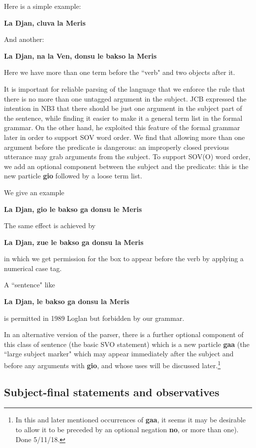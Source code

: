 \documentclass[12pt]{book}
\begin{document}
{Here is a simple example:

{\bf La Djan, cluva la Meris}

And another:

{\bf La Djan, na la Ven, donsu le bakso la Meris}

Here we have more than one term before the ``verb" and two objects after it.

It is important for reliable parsing of the language that we enforce the rule that there is no more than one untagged argument in the subject.  JCB
expressed the intention in NB3 that there should be just one argument in the subject part of the sentence, while finding it easier to make it a general term list in the formal  grammar.  On the other hand, he exploited this feature of the formal grammar  later in order to support SOV word order.  We find that allowing more than one argument
before the predicate is dangerous:  an improperly closed previous utterance may grab arguments from the subject.  To support SOV(O) word order,
we add an optional component between the subject and the predicate:  this is the new particle {\bf gio} followed by a loose term list.

We give an example

{\bf La Djan, gio le bakso ga donsu le Meris}

The same effect is achieved by

{\bf La Djan, zue le bakso ga donsu la Meris}

in which we get permission for the box to appear before the verb by applying a numerical case tag.

A ``sentence" like

{\bf*La Djan, le bakso ga donsu la Meris}

is permitted in 1989 Loglan but forbidden by our grammar.

In an alternative version of the parser, there is a further optional component of this class of sentence (the basic SVO statement) which is a new
particle {\bf gaa} (the ``large subject marker" which may appear immediately after the subject and before any arguments with {\bf gio}, and whose uses will be discussed later.\footnote{In this and later mentioned occurrences of {\bf gaa}, it seems it may be desirable to allow it to be preceded by an optional negation {\bf no}, or more than one). Done 5/11/18.}

\subsection{Subject-final statements and observatives}

}
\end{document}
